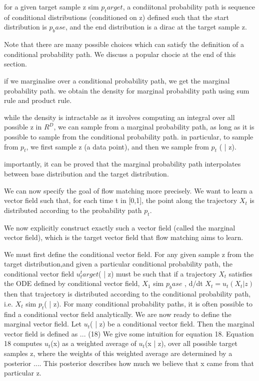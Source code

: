 \documentclass[12pt,a4paper]{report}
\begin{document}
for a given target sample z sim $p_target$, a condiitonal probability path is sequence of conditional distributions (conditioned on z) defined such that the start distribution is $p_base$, and the end distribution is a dirac at the target sample z. 

Note that there are many possible choices which can satisfy the definition of a conditional probability path. We discuss a popular chocie at the end of this section. 

if we marginalise over a conditional probability path, we get the marginal probability path. 
we obtain the density for marginal probability path using sum rule and product rule. 

while the density is intractable as it involves computing an integral over all possible z in $R^D$, we can sample from a marginal probability path, as long as it is possible to sample from the conditional probability path. 
in particular, to sample from $p_t$, we first sample z (a data point), and then we sample from $p_t$ ( | z). 


importantly, it can be proved that the marginal probability path interpolates between base distribution and the target distribution. 

We can now specify the goal of flow matching more precisely. We want to learn a vector field such that, for each time t in [0,1], the point along the trajectory $X_t$ is distributed according to the probability path $p_t$. 

We now explicitly construct exactly such a vector field (called the marginal vector field), which is the target vector field that flow matching aims to learn. 

We must first define the conditional vector field. 
For any given sample z from the target distribution,and given a particular conditional probability path, the conditional vector field $u_t^target$( | z) must be such that if a trajectory $X_t$ satisfies the ODE defined by conditional vector field, 
$X_1$ sim $p_base$ , d/dt $X_t = u_t(X_t | z)$
then that trajectory is distributed according to the conditional probability path, i.e. $X_t$ sim $p_t$( | z). 
For many conditional probability paths, it is often possible to find a conditional vector field analytically. 
We are now ready to define the marginal vector field. 
Let $u_t$( | z) be a conditional vector field. Then the marginal vector field is defined as ... (18)
We give some intuition for equation 18. 
Equation 18 computes $u_t$(x) as a weighted average of $u_t$(x | z), over all possible target samples z, where the weights of this weighted average are determined by a posterior .... 
This posterior describes how much we believe that x came from that particular z. 
\end{document}
